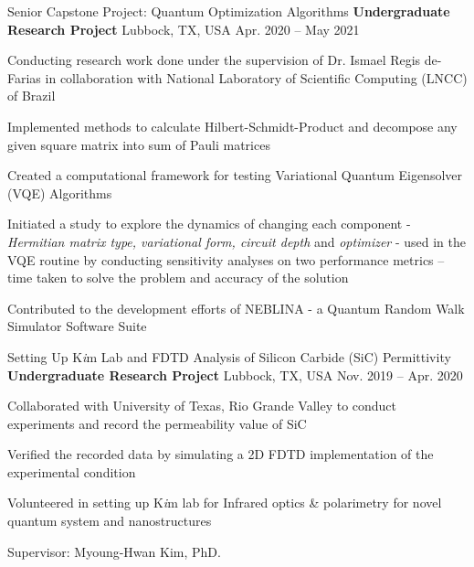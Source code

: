 
\begin{cventries}

  \cventry
  {Senior Capstone Project: Quantum Optimization Algorithms}
  {\textbf{Undergraduate Research Project}}
    {Lubbock, TX, USA}
    {Apr. 2020 -- May 2021}
    {
      \begin{cvitems}
        \item{Conducting research work done under the supervision of Dr. Ismael Regis de-Farias in collaboration with National Laboratory of Scientific Computing (LNCC) of Brazil}
        \item{Implemented methods to calculate Hilbert-Schmidt-Product and decompose any given square matrix into sum of Pauli matrices}
        \item{Created a computational framework for testing Variational Quantum Eigensolver (VQE) Algorithms}
        \item{Initiated a study to explore the dynamics of changing each component - \textit{Hermitian matrix type, variational form, circuit depth} and \textit{optimizer} - used in the VQE routine by conducting sensitivity analyses on two performance metrics – time taken to solve the problem and accuracy of the solution}
        \item{Contributed to the development efforts of NEBLINA - a Quantum Random Walk Simulator Software Suite}
      \end{cvitems}
    }

  \cventry
  {Setting Up K\textit{i}m Lab and FDTD Analysis of Silicon Carbide (SiC) Permittivity}
  {\textbf{Undergraduate Research Project}}
    {Lubbock, TX, USA}
    {Nov. 2019 -- Apr. 2020}
    {
      \begin{cvitems}
      \item{Collaborated with University of Texas, Rio Grande Valley to conduct experiments and record the permeability value of SiC}
      \item{Verified the recorded data by simulating a 2D FDTD implementation of the experimental condition}
      \item{Volunteered in setting up K\textit{i}m lab for Infrared optics \& polarimetry for novel quantum system and nanostructures}
      \item{Supervisor: Myoung-Hwan Kim, PhD.}
      \end{cvitems}
    }


\end{cventries}
